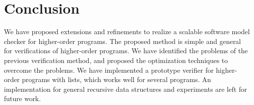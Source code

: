 \section{Conclusion}
\label{sec:conclusion}

We have proposed extensions and refinements to realize a scalable
software model checker for higher-order programs.  The proposed method
is simple and general for verifications of higher-order programs.  We
have identified the problems of the previous verification method, and proposed
the optimization techniques to overcome the problems.  We have
implemented a prototype verifier for higher-order programs with lists,
which works well for several programs.  An implementation for general
recursive data structures and experiments are left for future work.


